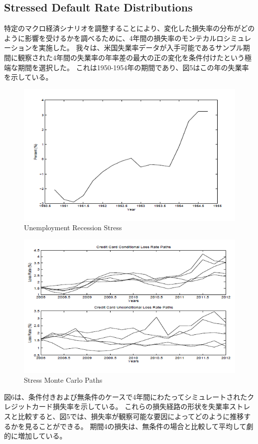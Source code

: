 \documentclass[a4j,12pt]{jarticle}
\begin{document}
\subsection{Stressed Default Rate Distributions}
特定のマクロ経済シナリオを調整することにより、変化した損失率の分布がどのように影響を受けるかを調べるために、4年間の損失率のモンテカルロシミュレーションを実施した。 我々は、米国失業率データが入手可能であるサンプル期間に観察された4年間の失業率の年率差の最大の正の変化を条件付けたという極端な期間を選択した。 これは1950-1954年の期間であり、図5はこの年の失業率を示している。
\begin{figure}[H]
\includegraphics{figure/ch5.png}
\caption{Unemployment Recession Stress}
\end{figure}
\begin{figure}[H]
\includegraphics{figure/ch6.png}
\caption{Stress Monte Carlo Paths}
\end{figure}
図6は、条件付きおよび無条件のケースで4年間にわたってシミュレートされたクレジットカード損失率を示している。 これらの損失経路の形状を失業率ストレスと比較すると、図5では、損失率が観察可能な要因によってどのように推移するかを見ることができる。 期間4の損失は、無条件の場合と比較して平均して劇的に増加している。\\
\end{document}
